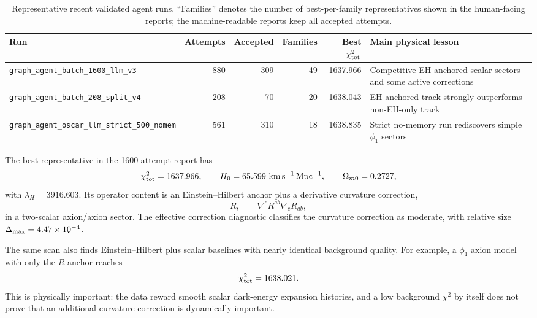 \documentclass[aps,prd,twocolumn,superscriptaddress,nofootinbib,longbibliography]{revtex4-2}
\newcommand{\chiT}{\chi^2_{\rm tot}}
\begin{document}
\begin{table}[t]
\centering
\begin{ruledtabular}
\begin{tabular}{lrrrrl}
Run & Attempts & Accepted & Families & Best $\chiT$ & Main physical lesson \\
\hline
\texttt{graph\_agent\_batch\_1600\_llm\_v3} & 880 & 309 & 49 & 1637.966 & Competitive EH-anchored scalar sectors and some active corrections \\
\texttt{graph\_agent\_batch\_208\_split\_v4} & 208 & 70 & 20 & 1638.043 & EH-anchored track strongly outperforms non-EH-only track \\
\texttt{graph\_agent\_oscar\_llm\_strict\_500\_nomem} & 561 & 310 & 18 & 1638.835 & Strict no-memory run rediscovers simple $\phi_1$ sectors \\
\end{tabular}
\end{ruledtabular}
\caption{Representative recent validated agent runs.  ``Families'' denotes the number of best-per-family representatives shown in the human-facing reports; the machine-readable reports keep all accepted attempts.}
\label{tab:results}
\end{table}

The best representative in the 1600-attempt report has
\begin{equation}
\chiT=1637.966,
\qquad
H_0=65.599~{\rm km\,s^{-1}\,Mpc^{-1}},
\qquad
\Omega_{m0}=0.2727,
\end{equation}
with $\lambda_H=3916.603$.  Its operator content is an Einstein--Hilbert anchor plus a derivative curvature correction,
\begin{equation}
R,\qquad \nabla^cR^{ab}\nabla_cR_{ab},
\end{equation}
in a two-scalar axion/axion sector.  The effective correction diagnostic classifies the curvature correction as moderate, with relative size $\Delta_{\rm max}=4.47\times10^{-4}$.

The same scan also finds Einstein--Hilbert plus scalar baselines with nearly identical background quality.  For example, a $\phi_1$ axion model with only the $R$ anchor reaches
\begin{equation}
\chiT=1638.021.
\end{equation}
This is physically important: the data reward smooth scalar dark-energy expansion histories, and a low background $\chi^2$ by itself does not prove that an additional curvature correction is dynamically important.
\end{document}
